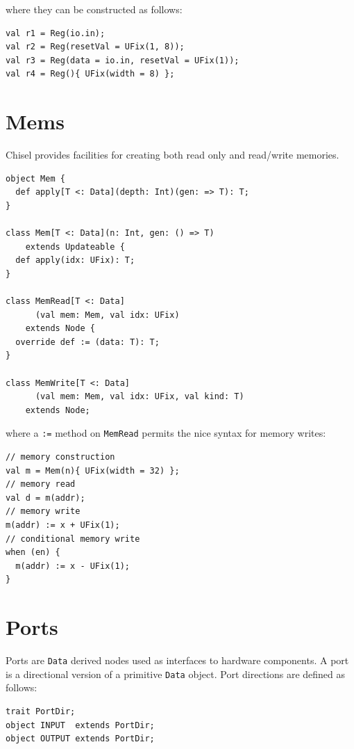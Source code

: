 \documentclass[10pt,twocolumn]{article}
\def\code#1{{\small\tt #1}}
\begin{document}
\noindent
where they can be constructed as follows:

\begin{lstlisting}
val r1 = Reg(io.in);
val r2 = Reg(resetVal = UFix(1, 8));
val r3 = Reg(data = io.in, resetVal = UFix(1));
val r4 = Reg(){ UFix(width = 8) };
\end{lstlisting}

\section{Mems}

Chisel provides facilities for creating both read only and
read/write memories.  

\begin{lstlisting}
object Mem {
  def apply[T <: Data](depth: Int)(gen: => T): T;
}

class Mem[T <: Data](n: Int, gen: () => T) 
    extends Updateable {
  def apply(idx: UFix): T;
}

class MemRead[T <: Data]
      (val mem: Mem, val idx: UFix) 
    extends Node {
  override def := (data: T): T;
}

class MemWrite[T <: Data]
      (val mem: Mem, val idx: UFix, val kind: T) 
    extends Node;
\end{lstlisting}

\noindent
where a \code{:=} method on \code{MemRead} permits the nice syntax for
memory writes:

\begin{lstlisting}
// memory construction
val m = Mem(n){ UFix(width = 32) };
// memory read
val d = m(addr);
// memory write
m(addr) := x + UFix(1);
// conditional memory write
when (en) {
  m(addr) := x - UFix(1);
}
\end{lstlisting}


\section{Ports}
\label{sec:ports}

Ports are \code{Data} derived nodes used as interfaces to hardware
components.   A port is a directional version of a primitive
\code{Data} object.  Port directions are defined as follows:

\begin{lstlisting}
trait PortDir;
object INPUT  extends PortDir;
object OUTPUT extends PortDir;
\end{lstlisting}
\end{document}
